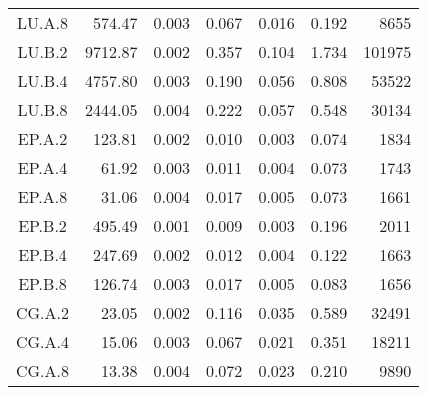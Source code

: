\begin{longtable}[c]{c*{6}{r}}
  LU.A.8                       & 574.47                       & 0.003                        & 0.067                      & 0.016                        & 0.192 & 8655   \\
  LU.B.2                       & 9712.87                      & 0.002                        & 0.357                      & 0.104                        & 1.734 & 101975 \\
  LU.B.4                       & 4757.80                      & 0.003                        & 0.190                      & 0.056                        & 0.808 & 53522  \\
  LU.B.8                       & 2444.05                      & 0.004                        & 0.222                      & 0.057                        & 0.548 & 30134  \\
  EP.A.2                       & 123.81                       & 0.002                        & 0.010                      & 0.003                        & 0.074 & 1834   \\
  EP.A.4                       & 61.92                        & 0.003                        & 0.011                      & 0.004                        & 0.073 & 1743   \\
  EP.A.8                       & 31.06                        & 0.004                        & 0.017                      & 0.005                        & 0.073 & 1661   \\
  EP.B.2                       & 495.49                       & 0.001                        & 0.009                      & 0.003                        & 0.196 & 2011   \\
  EP.B.4                       & 247.69                       & 0.002                        & 0.012                      & 0.004                        & 0.122 & 1663   \\
  EP.B.8                       & 126.74                       & 0.003                        & 0.017                      & 0.005                        & 0.083 & 1656   \\
  CG.A.2                       & 23.05                        & 0.002                        & 0.116                      & 0.035                        & 0.589 & 32491  \\
  CG.A.4                       & 15.06                        & 0.003                        & 0.067                      & 0.021                        & 0.351 & 18211  \\
  CG.A.8                       & 13.38                        & 0.004                        & 0.072                      & 0.023                        & 0.210 & 9890   \\

\end{longtable}
